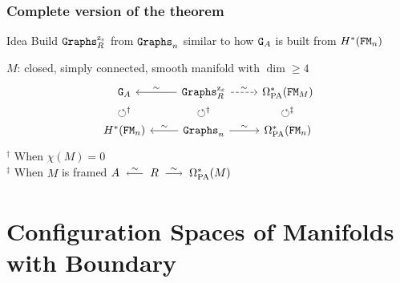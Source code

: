 \documentclass{beamer}
\begin{document}
\begin{frame}
  \frametitle{Complete version of the theorem}
  \begin{block}{Idea}
    Build $\mathtt{Graphs}^{\mathrm{z}_{\varepsilon}}_{R}$ from $\mathtt{Graphs}_{n}$ similar to how $\mathtt{G}_{A}$ is built from $H^{*}(\mathtt{FM}_{n})$
  \end{block}

  \pause
  \begin{theorem}
    $M$: closed, simply connected, smooth manifold with $\dim \ge 4$
    \[ \begin{tikzcd}[ampersand replacement=\&, row sep = 0]
        \GG{A} \& \ar[l, "\sim" swap] \Graphs^{\ze}_{R} \ar[r, dashed, "\sim"] \& \OmPA^{*}(\FM_{M}) \\
        \circlearrowleft^{\dagger} \& \circlearrowleft^{\dagger} \& \circlearrowleft^{\ddagger} \\
        H^{*}(\FM_{n}) \& \ar[l, "\sim" swap] \Graphs_{n} \ar[r, "\sim"] \& \OmPA^{*}(\FM_{n})
      \end{tikzcd} \]
    $^{\dagger}$ When $\chi(M) = 0$ \\
    $^{\ddagger}$ When $M$ is framed \hfill $A \qiso* R \qiso \OmPA^{*}(M)$
  \end{theorem}
\end{frame}

\section{Configuration Spaces of Manifolds with Boundary}
\end{document}
